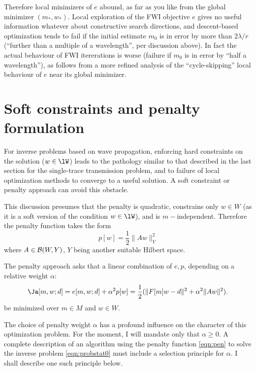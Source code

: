 Therefore local minimizers of $e$ abound, as far as you like from the
global minimizer $(m_*,w_*)$. Local exploration of the FWI objective
$e$ gives no useful information whatever about constructive search
directions, and descent-based optimization tends to fail if the
initial estimate $m_0$ is in error by more than $2\lambda/r$
(``further than a multiple of a wavelength'', per discussion
above). In fact the actual behaviour of FWI itererations is worse
(failure if $m_0$ is in error by ``half a wavelength''), as follows
from a more refined analysis of the ``cycle-skipping'' local behaviour of $e$ near its
global minimizer.

\section{Soft constraints and penalty formulation}

For inverse problems based on wave propagation, enforcing hard
constraints on the solution ($w \in \lW$) leads to the pathology
similar to that described in the last
section for the single-trace transmission problem, and to failure of
local optimization methods to converge to a useful solution. A soft
constraint or penalty approach can avoid this obstacle.

This
discussion presumes that the penalty is quadratic, constrains only
$w\in W$
(as it is a soft version of the condition $w \in \lW$), and is
$m-$independent. Therefore the penalty function takes the form
\begin{equation}
\label{eqn:pen}
p[w] = \frac{1}{2}\|Aw\|_Y^2 
\end{equation}
where $A \in {\cal B}(W,Y)$, $Y$ being another suitable Hilbert
space.

The penalty approach asks that a linear combination of $e,p$,
depending on a relative weight $\alpha$:
\begin{equation}
\Ja[m, w;d] = e[m,w;d] + \alpha^2 p[w] = \frac{1}{2}(\|F[m]w-d\|^2 + \alpha^2 \|Aw\|^2).
\label{eqn:pen}
\end{equation}
be minimized over $m\in M$ and $w\in W$.

The choice of penalty weight $\alpha$ has a profound influence on the
character of this optimization problem. For the moment, I will mandate
only that $\alpha \ge 0$. A complete description of an algorithm using
the penalty function \ref{eqn:pen} to solve the inverse problem
\ref{eqn:probstat0} must include a selection principle for $\alpha$. I
shall describe one such principle below.  

